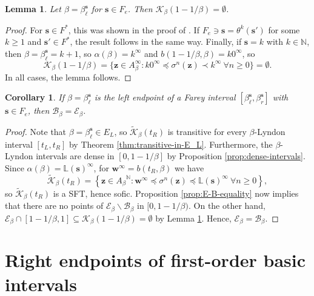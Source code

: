 \documentclass[11pt]{amsart}
\newtheorem{lemma}[theorem]{Lemma}
\newtheorem{corollary}[theorem]{Corollary}
\theoremstyle{definition}
\theoremstyle{remark}
\numberwithin{equation}{section}
\newcommand{\N}{\ensuremath{\mathbb{N}}}
\renewcommand{\L}{\ensuremath{\mathbb{L}}}
\newcommand{\BB}{\mathscr{B}}
\newcommand{\EE}{\mathscr{E}}
\newcommand{\Kt}{\widetilde{\mathcal{K}}}
\newcommand{\s}{ {\mathbf{s}}}
\newcommand{\w}{\mathbf{w}}
\newcommand{\z}{\mathbf{z}}
\newcommand{\set}[1]{\left\{#1\right\}}
\newcommand{\f}{\infty}
\newcommand{\al}{\alpha}
\newcommand{\lle}{\preccurlyeq}
\newcommand{\si}{\sigma}
\begin{document}


{
\begin{lemma} \label{lem:empty}
Let $\beta=\beta_\ell^\s$ for $\s\in F_e$. Then $\mathcal{K}_\beta(1-1/\beta)=\emptyset$.
\end{lemma}

\begin{proof}
For $\s\in F^*$, this was shown in the proof of \cite[Proposition 5.2]{Kalle-Kong-Langeveld-Li-18}. If $F_e\ni\s=\theta^k(\s')$ for some $k\geq 1$ and $\s'\in F^*$, the result follows in the same way. Finally, if $\s=k$ with $k\in\N$, then $\beta=\beta_\ell^\s=k+1$, so $\al(\beta)=k^\f$ and $b(1-1/\beta,\beta)=k0^\f$, so
\[
\mathcal{K}_\beta(1-1/\beta)=\{\z\in A_\beta^\f: k0^\f\lle \si^n(\z)\prec k^\f\ \forall n\geq 0\}=\emptyset.
\]
In all cases, the lemma follows.
\end{proof}
}

\begin{corollary} \label{cor:E-B-left-endpoints}
If $\beta=\beta_\ell^\s$ is the left endpoint of a Farey interval $[\beta_\ell^\s,\beta_r^\s]$ {with $\s\in F_e$}, then $\BB_\beta=\EE_\beta$.
\end{corollary}

\begin{proof}
Note that $\beta=\beta_\ell^\s\in E_L$, so $\Kt_\beta(t_R)$ is transitive for every $\beta$-Lyndon interval $[t_L,t_R]$ by Theorem \ref{thm:transitive-in-E_L}. Furthermore, the $\beta$-Lyndon intervals are dense in $[0,1-1/\beta]$ by Proposition \ref{prop:dense-intervals}. Since $\al(\beta)=\L(\s)^\f$, {for $\w^\f=b(t_R, \beta)$} we have
\[
\Kt_\beta(t_R)=\set{\z\in{A_\beta}^\N: \w^\f\lle \si^n(\z)\lle \L(\s)^\f~\forall n\ge 0},
\]
so $\Kt_\beta(t_R)$ is a SFT, hence sofic. Proposition \ref{prop:E-B-equality} now implies that there are no points of $\EE_\beta\backslash\BB_\beta$ in $[0,1-1/\beta)$. On the other hand, $\EE_\beta\cap[1-1/\beta,1]\subseteq \mathcal{K}_\beta(1-1/\beta)=\emptyset$ {by Lemma \ref{lem:empty}}. Hence, $\EE_\beta=\BB_\beta$.
\end{proof}



\section{Right endpoints of first-order basic intervals} \label{sec:right-endpoints}
\end{document}
